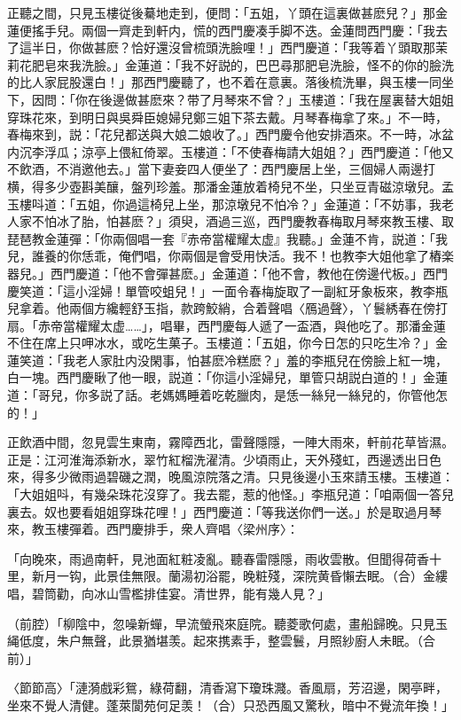 正聽之間，只見玉樓従後驀地走到，便問：「五姐，丫頭在這裏做甚麽兒？」那金蓮便搖手兒。兩個一齊走到軒内，慌的西門慶凑手脚不迭。金蓮問西門慶：「我去了這半日，你做甚麽？恰好還沒曾梳頭洗臉哩！」西門慶道：「我等着丫頭取那茉莉花肥皂來我洗臉。」金蓮道：「我不好説的，巴巴尋那肥皂洗臉，怪不的你的臉洗的比人家屁股還白！」那西門慶聽了，也不着在意裏。落後梳洗畢，與玉樓一同坐下，因問：「你在後邊做甚麽來？带了月琴來不曾？」玉樓道：「我在屋裏替大姐姐穿珠花來，到明日與吳舜臣媳婦兒鄭三姐下茶去戴。月琴春梅拿了來。」不一時，春梅來到，説：「花兒都送與大娘二娘收了。」西門慶令他安排酒來。不一時，冰盆内沉李浮瓜；涼亭上偎紅倚翠。玉樓道：「不使春梅請大姐姐？」西門慶道：「他又不飲酒，不消邀他去。」當下妻妾四人便坐了：西門慶居上坐，三個婦人兩邊打横，得多少壺斟美釀，盤列珍羞。那潘金蓮放着椅兒不坐，只坐豆青磁涼墩兒。孟玉樓呌道：「五姐，你過這椅兒上坐，那涼墩兒不怕冷？」金蓮道：「不妨事，我老人家不怕冰了胎，怕甚麽？」須臾，酒過三巡，西門慶教春梅取月琴來教玉樓、取琵琶教金蓮彈：「你兩個唱一套『赤帝當權耀太虚』我聽。」金蓮不肯，説道：「我兒，誰養的你恁乖，俺們唱，你兩個是會受用快活。我不！也教李大姐他拿了樁楽器兒。」西門慶道：「他不會彈甚麽。」金蓮道：「他不會，教他在傍邊代板。」西門慶笑道：「這小淫婦！單管咬蛆兒！」一面令春梅旋取了一副紅牙象板來，教李瓶兒拿着。他兩個方纔輕舒玉指，款跨鮫綃，合着聲唱〈鴈過聲〉，丫鬟綉春在傍打扇。「赤帝當權耀太虚……」，唱畢，西門慶每人遞了一盃酒，與他吃了。那潘金蓮不住在席上只呷冰水，或吃生菓子。玉樓道：「五姐，你今日怎的只吃生冷？」金蓮笑道：「我老人家肚内没閑事，怕甚麽冷糕麽？」羞的李瓶兒在傍臉上紅一塊，白一塊。西門慶瞅了他一眼，説道：「你這小淫婦兒，單管只胡説白道的！」金蓮道：「哥兒，你多説了話。老媽媽睡着吃乾臘肉，是恁一絲兒一絲兒的，你管他怎的！」

正飲酒中間，忽見雲生東南，霧障西北，雷聲隱隱，一陣大雨來，軒前花草皆濕。正是：江河淮海添新水，翠竹紅榴洗濯清。少頃雨止，天外殘虹，西邊透出日色來，得多少微雨過碧磯之潤，晚風涼院落之清。只見後邊小玉來請玉樓。玉樓道：「大姐姐呌，有幾朵珠花沒穿了。我去罷，惹的他怪。」李瓶兒道：「咱兩個一答兒裏去。奴也要看姐姐穿珠花哩！」西門慶道：「等我送你們一送。」於是取過月琴來，教玉樓彈着。西門慶排手，衆人齊唱〈梁州序〉：

「向晚來，雨過南軒，見池面紅粧凌亂。聽春雷隱隱，雨收雲散。但聞得荷香十里，新月一钩，此景佳無限。蘭湯初浴罷，晚粧殘，深院黄昏懶去眠。（合）金縷唱，碧筒勸，向冰山雪檻排佳宴。清世界，能有幾人見？」

（前腔）「柳陰中，忽噪新蟬，早流螢飛來庭院。聽菱歌何處，畫船歸晚。只見玉䋲低度，朱户無聲，此景猶堪羡。起來携素手，整雲鬟，月照紗廚人未眠。（合前）」

〈節節高〉「漣漪戲彩鴛，綠荷翻，清香瀉下瓊珠濺。香風扇，芳沼邊，閑亭畔，坐來不覺人清健。蓬萊閬苑何足羡！（合）只恐西風又驚秋，暗中不覺流年換！」

